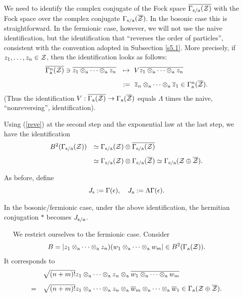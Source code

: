 \documentclass{svmult}
\newcommand{\beq}{\begin{equation}}
\newcommand{\eeq}{\end{equation}}
\def\bet{\begin{theorem}}
\def\eet{\end{theorem}}
\def\bar{\overline}
\def\s{{\rm s}}
\def\sa{{\rm s/a}}
\def\proof{
\noindent{\bf Proof.}\ \ }
\def\cZ{{\cal Z}}
\def\a{{\rm a}}
\def\s{{\rm s}}
\begin{document}
We need to identify the  complex conjugate of the Fock space
 $\bar{\Gamma_\sa(\cZ)}$ with the Fock space over the complex conjugate
 $\Gamma_\sa(\bar\cZ)$.
 In the bosonic case this is straightforward. In the fermionic case, however,
 we will not use  the naive identification, but
 the identification that ``reverses the order of particles'', consistent with
 the convention adopted in Subsection \ref{s5.1}.
 More precisely,
 if $z_1,\dots,z_n\in\cZ$, then the identification looks as follows:
\beq\begin{array}{rl}
\bar{\Gamma_\a^n(\cZ)}\ni\bar{z_1\otimes_\a\cdots\otimes_\a z_n}&
\mapsto \ V\bar{z_1\otimes_\a\cdots\otimes_\a z_n}\\[3mm]
&:=\ \bar z_n\otimes_\a\cdots\otimes_\a\bar
 z_1\in\Gamma_\a^n(\bar\cZ).\end{array}\label{reve}\eeq
(Thus the identification  $V:\bar{\Gamma_\a(\cZ)}\to\Gamma_\a(\bar\cZ)$ 
equals $\Lambda$ times the naive,
``nonreversing'', identification). 


 Using  (\ref{reve}) at the second step and the exponential law
at the 
last step, we
have the identification
\begin{equation}\begin{array}{rl}
 B^2(\Gamma_\sa(\cZ))&\simeq\Gamma_\sa(\cZ)\otimes
\bar{\Gamma_\sa(\cZ)}\\[3mm]
&\simeq
\Gamma_\sa(\cZ)\otimes\Gamma_\sa(\bar\cZ)\simeq
\Gamma_\sa(\cZ\oplus\bar\cZ).\end{array}\label{isom3}\end{equation}


 As before, define
\[J_\s:=\Gamma(\epsilon),\ \ \ J_\a:=\Lambda\Gamma(\epsilon).\]
\bet 
In the bosonic/fermionic case, under the above identification, the hermitian
conjugation $*$  becomes $J_\sa$.
\eet

\proof
 We restrict ourselves to the fermionic case.
Consider
\[B=|z_1\otimes_\a\cdots\otimes_\a z_n)(w_1\otimes_\a\cdots\otimes_\a w_m|
\in B^2(\Gamma_\a(\cZ)).\]
It corresponds to
\[\begin{array}{rl}
&\sqrt{(n+m)!}
z_1\otimes_\a\cdots\otimes_\a z_n\otimes_\a\bar{w_1\otimes_\a\cdots\otimes_\a
  w_m}\\[3mm] =&
\sqrt{(n+m)!}
z_1\otimes_\a\cdots\otimes_\a z_n\otimes_\a\bar w_m\otimes_\a\cdots\otimes_\a
  \bar w_1 \in\Gamma_\a(\cZ\oplus\bar\cZ)
.\end{array}\]
\end{document}
